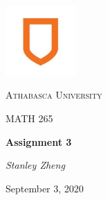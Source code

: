 \documentclass[11pt, letterpaper, twoside]{article}
\begin{document}
\begin{titlepage}
\centering
\vspace*{60px}
\hspace{0pt}
\includegraphics[width=0.2\textwidth]{logo}\par\vspace{1cm}
{\scshape\LARGE Athabasca University \par}
\vspace{1cm}
{\scshape\Large MATH 265\par}
\vspace{1.5cm}
{\huge\bfseries Assignment 3\par}
\vspace{2cm}
{\Large\itshape Stanley Zheng\par}
\vfill
{\large September 3, 2020\par}
\vspace*{50px}
\hspace{0pt}
\pagebreak
\end{titlepage}
\end{document}
